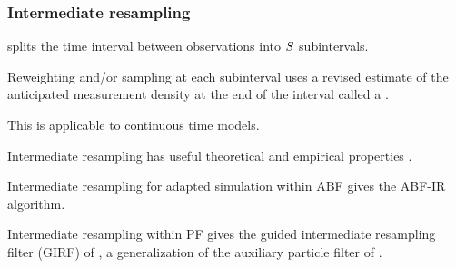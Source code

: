 \documentclass{beamer}
\begin{document}
\begin{frame}
\frametitle{Intermediate resampling}



\begin{myitemize}
\item {} splits the time interval between observations into $S$ subintervals.

\vspace{2mm}

\item Reweighting and/or sampling at each subinterval uses a revised estimate of the anticipated measurement density at the end of the interval called a .

\vspace{2mm}

\item This is applicable to continuous time models.

\vspace{2mm}

\item Intermediate resampling has useful theoretical and empirical properties \citep{delmoral15,park19}.

\vspace{2mm}

\item Intermediate resampling for adapted simulation within ABF gives the ABF-IR algorithm.

\vspace{2mm}

\item Intermediate resampling within PF gives the guided intermediate resampling filter (GIRF) of \citet{park19}, a generalization of the auxiliary particle filter of \citet{pitt99}.
  
\end{myitemize}

\end{frame}
\end{document}
